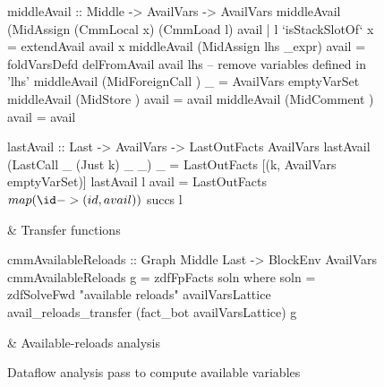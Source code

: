 \documentclass[blockstyle,preprint,nocopyrightspace]{sigplanconf}
\newcommand\figlabel[1]{\label{fig:#1}}
\begin{document}
\begin{figure*}
\begin{codetable}
\begin{code}
middleAvail :: Middle -> AvailVars -> AvailVars
middleAvail (MidAssign (CmmLocal x) (CmmLoad l) avail
                 | l `isStackSlotOf` x = extendAvail avail x
middleAvail (MidAssign lhs _expr) avail = 
  foldVarsDefd delFromAvail avail lhs  -- remove variables defined in 'lhs'
middleAvail (MidForeignCall {})   _    = AvailVars emptyVarSet
middleAvail (MidStore {})         avail = avail
middleAvail (MidComment {})       avail = avail

lastAvail :: Last -> AvailVars -> LastOutFacts AvailVars
lastAvail (LastCall _ (Just k) _ _) _ = LastOutFacts [(k, AvailVars emptyVarSet)]
lastAvail l avail = LastOutFacts $ map (\id -> (id, avail)) $ succs l
\end{code}\B
& Transfer \mbox{functions}\\
\hline

\T\begin{code}
cmmAvailableReloads :: Graph Middle Last -> BlockEnv AvailVars
cmmAvailableReloads g = zdfFpFacts soln
  where soln = zdfSolveFwd "available reloads" availVarsLattice 
               avail_reloads_transfer (fact_bot availVarsLattice) g
\end{code}\B
& Available-reloads analysis\\

\end{codetable}
\caption{Dataflow analysis pass to compute available variables}
\figlabel{avail-all}
\figlabel{avail}
\figlabel{avail-lattice}
\figlabel{avail-gen-kill}
\figlabel{avail-transfers}
\figlabel{avail-running}
\end{figure*}
\end{document}
